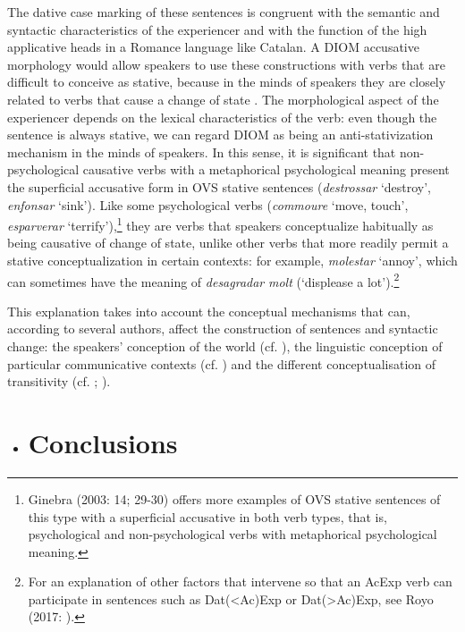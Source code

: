 \documentclass[output=paper,modfonts,nonflat]{langsci/langscibook}
\begin{document}
The dative case marking of these sentences is congruent with the semantic and syntactic characteristics of the experiencer and with the function of the high applicative heads in a Romance language like Catalan. A DIOM accusative morphology would allow speakers to use these constructions with verbs that are difficult to conceive as stative, because in the minds of speakers they are closely related to verbs that cause a change of state . The morphological aspect of the experiencer depends on the lexical characteristics of the verb: even though the sentence is always stative, we can regard DIOM as being an anti-stativization mechanism in the minds of speakers. In this sense, it is significant that non-psychological causative verbs with a metaphorical psychological meaning present the superficial accusative form in OVS stative sentences (\textit{destrossar} ‘destroy’, \textit{enfonsar} ‘sink’). Like some psychological verbs (\textit{commoure} ‘move, touch’, \textit{esparverar} ‘terrify’),\footnote{Ginebra (2003: 14; 29-30) offers more examples of OVS stative sentences of this type with a superficial accusative in both verb types, that is, psychological and non-psychological verbs with metaphorical psychological meaning.} they are verbs that speakers conceptualize habitually as being causative of change of state, unlike other verbs that more readily permit a stative conceptualization in certain contexts: for example, \textit{molestar} ‘annoy’, which can sometimes have the meaning of \textit{desagradar} \textit{molt} (‘displease a lot').\footnote{For an explanation of other factors that intervene so that an AcExp verb can participate in sentences such as Dat(<Ac)Exp or Dat(>Ac)Exp, see Royo (2017: ).}

This explanation takes into account the conceptual mechanisms that can, according to several authors, affect the construction of sentences and syntactic change: the speakers’ conception of the world (cf. \citealt{Ramos2002}), the linguistic conception of particular communicative contexts (cf. \citealt{Rosselló2008}) and the different conceptualisation of transitivity (cf. \citealt{Ynglès2011}; \citealt{Pineda2012}).

\begin{itemize}
\item \section{Conclusions}
\end{itemize}
\end{document}
